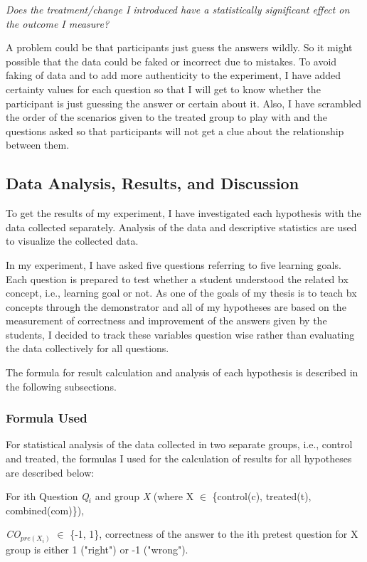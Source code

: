 \emph{Does the treatment/change I introduced have a statistically significant effect on the outcome I measure?}

\medskip
\noindent A problem could be that participants just guess the answers wildly. So it might possible that the data could be faked or incorrect due to mistakes. To avoid faking of data and to add more authenticity to the experiment, I have added certainty values for each question so that I will get to know whether the participant is just guessing the answer or certain about it. Also, I have scrambled the order of the scenarios given to the treated group to play with and the questions asked so that participants will not get a clue about the relationship between them.

\subsection{Data Analysis, Results, and Discussion}\label{subsec:results}
To get the results of my experiment, I have investigated each hypothesis with the data collected separately. Analysis of the data and descriptive statistics are used to visualize the collected data. 

In my experiment, I have asked five questions referring to five learning goals. Each question is prepared to test whether a student understood the related bx concept, i.e., learning goal or not. As one of the goals of my thesis is to teach bx concepts through the demonstrator and all of my hypotheses are based on the measurement of correctness and improvement of the answers given by the students, I decided to track these variables question wise rather than evaluating the data collectively for all questions.

The formula for result calculation and analysis of each hypothesis is described in the following subsections.

\subsubsection{Formula Used}\label{subsubsec:evaluation_formula}
For statistical analysis of the data collected in two separate groups, i.e., control and treated, the formulas I used for the calculation of results for all hypotheses are described below:

For ith Question \textit{Q$_{i}$} and group \textit{X} (where X $\in$ \{control(c), treated(t), combined(com)\}),

\textit{CO$_{pre(X_i)}$} $\in$ \{-1, 1\}, correctness of the answer to the ith pretest question for X group is either 1 ("right") or -1 ("wrong").

